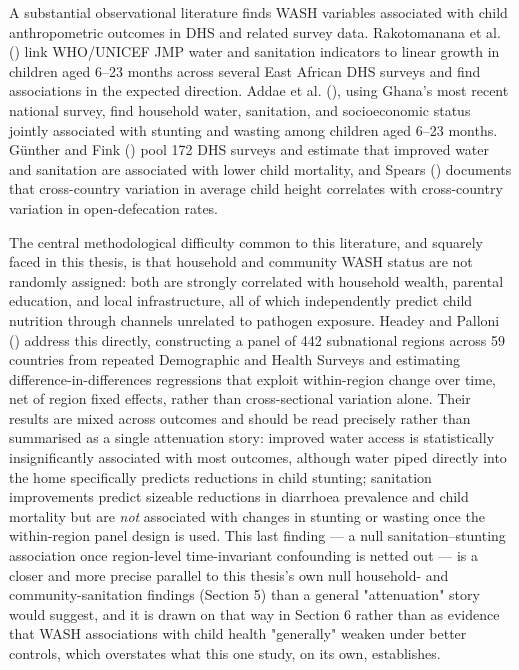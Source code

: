 A substantial observational literature finds WASH variables associated with child anthropometric outcomes in DHS and related survey data. Rakotomanana et al. (\citeyear{Rakotomanana2020}) link WHO/UNICEF JMP water and sanitation indicators to linear growth in children aged 6--23 months across several East African DHS surveys and find associations in the expected direction. Addae et al. (\citeyear{Addae2024}), using Ghana's most recent national survey, find household water, sanitation, and socioeconomic status jointly associated with stunting and wasting among children aged 6--23 months. Günther and Fink (\citeyear{Gunther2010}) pool 172 DHS surveys and estimate that improved water and sanitation are associated with lower child mortality, and Spears (\citeyear{Spears2013}) documents that cross-country variation in average child height correlates with cross-country variation in open-defecation rates.

The central methodological difficulty common to this literature, and squarely faced in this thesis, is that household and community WASH status are not randomly assigned: both are strongly correlated with household wealth, parental education, and local infrastructure, all of which independently predict child nutrition through channels unrelated to pathogen exposure. Headey and Palloni (\citeyear{HeadeyPalloni2019}) address this directly, constructing a panel of 442 subnational regions across 59 countries from repeated Demographic and Health Surveys and estimating difference-in-differences regressions that exploit within-region change over time, net of region fixed effects, rather than cross-sectional variation alone. Their results are mixed across outcomes and should be read precisely rather than summarised as a single attenuation story: improved water access is statistically insignificantly associated with most outcomes, although water piped directly into the home specifically predicts reductions in child stunting; sanitation improvements predict sizeable reductions in diarrhoea prevalence and child mortality but are \textit{not} associated with changes in stunting or wasting once the within-region panel design is used. This last finding --- a null sanitation--stunting association once region-level time-invariant confounding is netted out --- is a closer and more precise parallel to this thesis's own null household- and community-sanitation findings (Section 5) than a general "attenuation" story would suggest, and it is drawn on that way in Section 6 rather than as evidence that WASH associations with child health "generally" weaken under better controls, which overstates what this one study, on its own, establishes.

